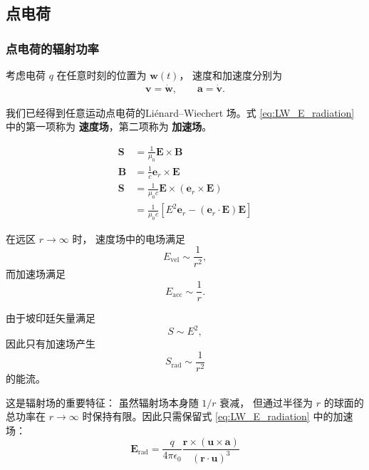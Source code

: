 \subsection{点电荷}
\subsubsection{点电荷的辐射功率}

考虑电荷 $q$ 在任意时刻的位置为 $\boldsymbol{w}(t)$，
速度和加速度分别为
\begin{align*}
    \boldsymbol{v}=\dot{\boldsymbol{w}},
    \qquad
    \boldsymbol{a}=\dot{\boldsymbol{v}}.
\end{align*}

我们已经得到任意运动点电荷的Liénard--Wiechert 场。式 \ref{eq:LW_E_radiation} 中的第一项称为
\textbf{速度场}，第二项称为
\textbf{加速场}。

\begin{align*}
    \boldsymbol S
    &=
    \frac{1}{\mu_0}
    \boldsymbol E\times\boldsymbol B\\
    \boldsymbol B
    &=
    \frac{1}{c}{\boldsymbol{e}_r}\times\boldsymbol E\\
    \boldsymbol S
    &=
    \frac{1}{\mu_0c}
    \boldsymbol E\times
    \left(
        \boldsymbol{e}_r\times\boldsymbol E
    \right)
    \\
    &=
    \frac{1}{\mu_0c}
    \left[
        E^2\boldsymbol{e}_r
        -
        (\boldsymbol{e}_r\cdot\boldsymbol E)\boldsymbol E
    \right]
\end{align*}


在远区 $r\rightarrow\infty$ 时，
速度场中的电场满足
\begin{equation}
    E_{\mathrm{vel}}\sim\frac{1}{r^2},
\end{equation}
而加速场满足
\begin{equation}
    E_{\mathrm{acc}}\sim\frac{1}{r}.
\end{equation}

由于坡印廷矢量满足
\begin{equation}
    S\sim E^2,
\end{equation}
因此只有加速场产生
\begin{equation}
    S_{\mathrm{rad}}\sim\frac{1}{r^2}
\end{equation}
的能流。

这是辐射场的重要特征：
虽然辐射场本身随 $1/r$ 衰减，
但通过半径为 $r$ 的球面的总功率在 $r\rightarrow\infty$ 时保持有限。因此只需保留式 \ref{eq:LW_E_radiation}
中的加速场：
\begin{equation}
    \boxed{
    \boldsymbol E_{\mathrm{rad}}
    =
    \frac{q}{4\pi\epsilon_0}
    \frac{
        \boldsymbol r\times
        (\boldsymbol u\times\boldsymbol a)
    }
    {(\boldsymbol r\cdot\boldsymbol u)^3}
    }
    \label{eq:Erad_general}
\end{equation}

